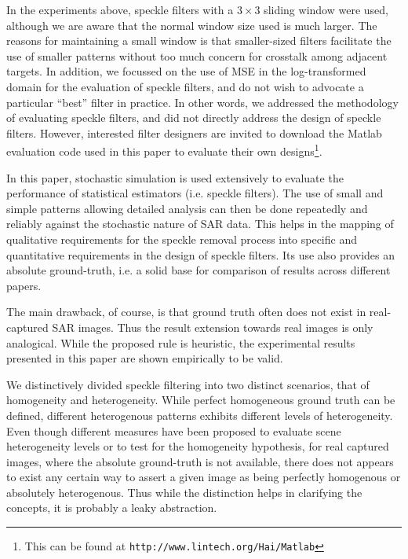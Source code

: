 \documentclass[journal]{IEEEtran}
\begin{document}
In the experiments above, speckle filters with a $3 \times 3$ sliding window were used, 
	although we are aware that the normal window size used is much larger. 
The reasons for maintaining a small window is that 
	smaller-sized filters facilitate the use of smaller patterns without too much concern for crosstalk 
	among adjacent targets.
In addition, we focussed on the use of MSE in the log-transformed domain for the evaluation of speckle filters, 
	and do not wish to advocate a particular ``best'' filter in practice. 
In other words, we addressed the methodology of evaluating speckle filters, 
	and did not directly address the design of speckle filters.
However, interested filter designers are invited to download the Matlab evaluation code used in this paper 
to evaluate their own designs\footnote{This can be found at \texttt{http://www.lintech.org/Hai/Matlab}}.

In this paper, stochastic simulation is used extensively to evaluate the performance of statistical estimators 
(i.e. speckle filters).
The use of small and simple patterns allowing detailed analysis can then be done repeatedly and reliably against the 
stochastic nature of SAR data.
This helps in the mapping of qualitative requirements for the speckle removal process into specific and quantitative 
requirements in the design of speckle filters.
Its use also provides an absolute ground-truth, i.e. a solid base for comparison of results across different papers.

The main drawback, of course, is that ground truth often does not exist in real-captured SAR images.
Thus the result extension towards real images is only analogical.
While the proposed rule is heuristic, 
	the experimental results presented in this paper are shown empirically to be valid.

We distinctively divided speckle filtering into two distinct scenarios, that of homogeneity and heterogeneity.
While perfect homogeneous ground truth can be defined, 
	different heterogenous patterns exhibits different levels of heterogeneity. 
Even though different measures have been proposed to evaluate scene heterogeneity levels or to test for the 
homogeneity hypothesis, 
	for real captured images, where the absolute ground-truth is not available, 
	there does not appears to exist any certain way to assert a given image as being perfectly homogenous or 
	absolutely heterogenous.
Thus while the distinction helps in clarifying the concepts, 
	it is probably a leaky abstraction.
\end{document}
